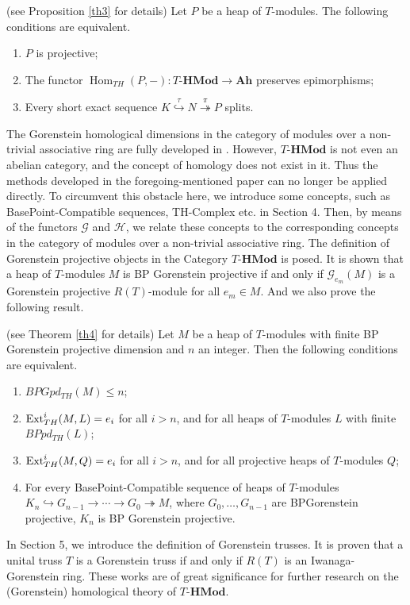 \documentclass[11pt, twoside]{article}
\begin{document}
\begin{theorem}\label{main1} {\rm (see Proposition \ref{th3} for details)
Let $P$ be a heap of $T$-modules. The following conditions are equivalent.}
\begin{enumerate}\rm
    \item[\rm(1)] $P$ is projective;
    \item[\rm(2)] The functor $\operatorname{Hom}_{TH}(P,-): T\textbf{-HMod} \rightarrow  \textbf{Ah}$ preserves epimorphisms;
    \item[\rm(3)] Every short exact sequence $K \stackrel{\tau}{\hookrightarrow} N \stackrel{\pi}{\twoheadrightarrow} P$ splits.
\end{enumerate}
\end{theorem}
The Gorenstein homological dimensions in the category of modules over a non-trivial associative ring are fully developed in \cite{rb}. However, $T\textbf{-HMod}$ is not even an abelian category, and the concept of homology does not exist in it. Thus the methods developed in the foregoing-mentioned paper can no longer be applied directly. To circumvent this obstacle here, we introduce some concepts, such as BasePoint-Compatible sequences, TH-Complex etc. in Section 4. Then, by means of the functors $\mathcal{G}$ and $\mathcal{H}$, we relate these concepts to the corresponding concepts in the category of modules over a non-trivial associative ring. The definition of Gorenstein projective objects in the Category $T\textbf{-HMod}$ is posed. It is shown that a heap of $T$-modules $M$ is BP Gorenstein projective if and only if $\mathcal{G}_{e_m}(M)$ is a Gorenstein projective $R(T)$-module for all $e_m\in M$. And we also prove the following result.
\begin{theorem}{\rm (see Theorem \ref{th4} for details)
Let $M$ be a heap of $T$-modules with finite BP Gorenstein projective dimension and $n$ an integer. Then the following conditions are equivalent.}
\begin{enumerate}
    \item[\rm(i)] $BPGpd_{TH}(M)\leq n $;
    \item[\rm(ii)] ${\rm Ext}_{TH}^{i}(M, L) = e_i$ for all $i > n$, and for all heaps of $T$-modules $L$ with finite $BPpd_{TH}(L)$;
    \item[\rm(iii)] ${\rm Ext}_{TH}^{i}(M, Q) = e_i$ for all $i > n$, and for all projective heaps of $T$-modules $Q$;
    \item[\rm(iv)] For every BasePoint-Compatible sequence of heaps of $T$-modules $K_{n} \hookrightarrow G_{n-1} \to \cdots \to G_{0} \twoheadrightarrow M$, where $G_{0}, \dots, G_{n-1}$ are BPGorenstein projective, $K_{n}$ is BP Gorenstein projective.
\end{enumerate}
\end{theorem}
In Section 5, we introduce the definition of Gorenstein trusses. It is proven that a unital truss $T$ is a Gorenstein truss if and only if $R(T)$ is an Iwanaga-Gorenstein ring. These works are of great significance for further research on
the (Gorenstein) homological theory of $T\textbf{-HMod}$.
\end{document}
